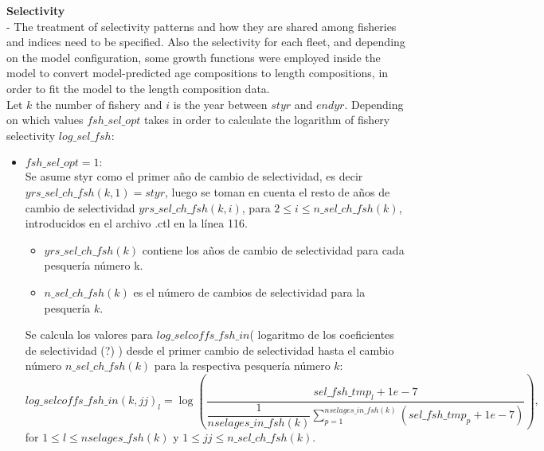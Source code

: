\documentclass{article}
\begin{document}
\textbf{Selectivity}\\
- The treatment of selectivity patterns and how they are shared among fisheries and indices need to be specified. Also the selectivity for each fleet, and depending on the model configuration, some growth functions were employed inside the model to convert model-predicted age compositions to length compositions, in order to fit the model to the length composition data.\\

Let $k$ the number of fishery and $i$ is the year between $styr$ and $endyr$.
Depending on which values $fsh\_sel\_opt$ takes in order to calculate the logarithm of fishery selectivity $log\_sel\_fsh$:
\begin{itemize}
\item $fsh\_sel\_opt=1:$\\
Se asume styr como el primer año de cambio de selectividad, es decir $yrs\_sel\_ch\_fsh(k,1)=styr$, luego se toman en cuenta el resto de años de cambio de selectividad $yrs\_sel\_ch\_fsh(k,i)$, para $2\leq i \leq n\_sel\_ch\_fsh(k)$, introducidos en el archivo .ctl en la línea 116.
\begin{itemize}
    \item $yrs\_sel\_ch\_fsh(k)$ contiene los años de cambio de selectividad para cada pesquería número k.
    \item $n\_sel\_ch\_fsh(k)$ es el número de cambios de selectividad para la pesquería $k$.
    
\end{itemize}

Se calcula los valores para $log\_selcoffs\_fsh\_in$( logaritmo de los coeficientes de selectividad (?) ) desde el primer cambio de selectividad hasta el cambio número $n\_sel\_ch\_fsh(k)$ para la respectiva pesquería número $k$:
\begin{equation}
    log\_selcoffs\_fsh\_in(k,jj)_l=\log\left(\dfrac{sel\_fsh\_tmp_l+1e-7}{\dfrac{1}{nselages\_in\_fsh(k)}\displaystyle\sum_{p=1}^{nselages\_in\_fsh(k)}(sel\_fsh\_tmp_p+1e-7)}\right),
\end{equation}
for $1\leq l \leq nselages\_fsh(k)$ y $1\leq jj \leq n\_sel\_ch\_fsh(k)$.


\end{itemize}
\end{document}
